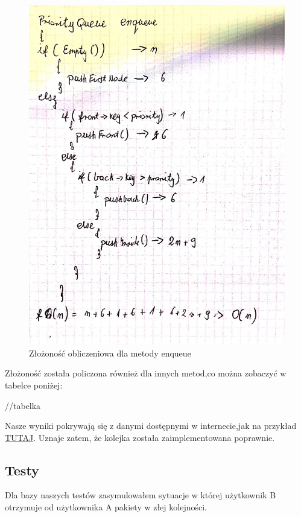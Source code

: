 \documentclass{article}
\begin{document}
\begin{figure}[H]
    \centering
    \hspace*{-1cm}
    \includegraphics[totalheight=10cm]{zlozonosc.jpg}
    \caption{Złożoność obliczeniowa dla metody enqueue}
    \label{2}
\end{figure}

Złożoność została policzona również dla innych metod,co można zobaczyć w tabelce poniżej:

//tabelka

Nasze wyniki pokrywają się z danymi dostępnymi w internecie,jak na przykład 
\href{https://eduinf.waw.pl/inf/alg/001_search/0106.php}{TUTAJ}. Uznaje zatem,
że kolejka została zaimplementowana poprawnie.


\subsection{Testy}
Dla bazy naszych testów zasymulowałem sytuacje w której użytkownik B otrzymuje od
użytkownika A pakiety w złej kolejności.
\end{document}
